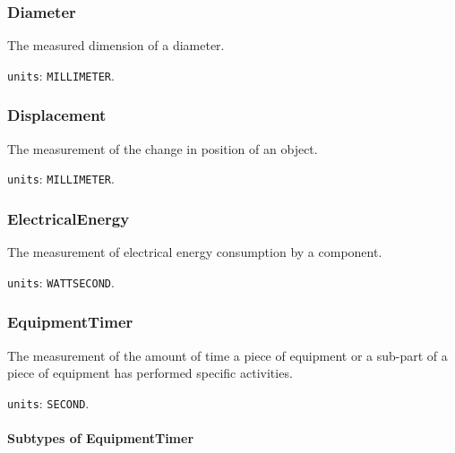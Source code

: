 \subsubsection{Diameter}
\label{sec:Diameter}



The measured dimension of a diameter.


\texttt{units}: \texttt{MILLIMETER}.


\subsubsection{Displacement}
\label{sec:Displacement}



The measurement of the change in position of an object.


\texttt{units}: \texttt{MILLIMETER}.


\subsubsection{ElectricalEnergy}
\label{sec:ElectricalEnergy}



The measurement of electrical energy consumption by a component.


\texttt{units}: \texttt{WATT\textunderscore SECOND}.


\subsubsection{EquipmentTimer}
\label{sec:EquipmentTimer}



The measurement of the amount of time a piece of equipment or a sub-part of a piece of equipment has performed specific activities.


\texttt{units}: \texttt{SECOND}.

\paragraph{Subtypes of EquipmentTimer}\mbox{}
\label{sec:Subtypes of EquipmentTimer}

